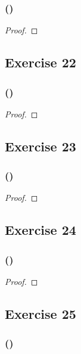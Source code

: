 \documentclass[14pt]{extarticle}
\begin{document}
\subsubsection{()}

\begin{proof}

\end{proof}

\subsection{Exercise 22}

\subsubsection{()}

\begin{proof}

\end{proof}

\subsection{Exercise 23}

\subsubsection{()}

\begin{proof}

\end{proof}

\subsection{Exercise 24}

\subsubsection{()}

\begin{proof}

\end{proof}

\subsection{Exercise 25}

\subsubsection{()}
\end{document}
